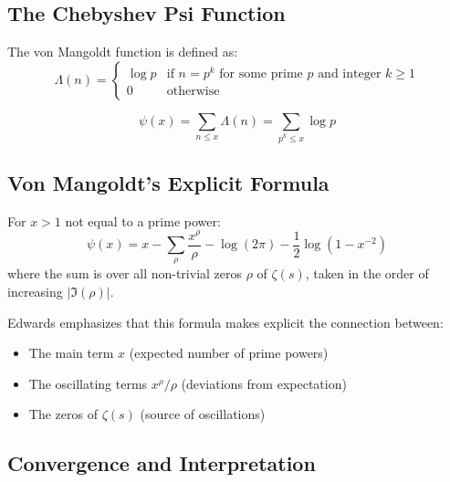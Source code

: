 \subsection{The Chebyshev Psi Function}

\begin{definition}
The von Mangoldt function is defined as:
\begin{equation}
\Lambda(n) = \begin{cases}
\log p & \text{if } n = p^k \text{ for some prime } p \text{ and integer } k \geq 1\\
0 & \text{otherwise}
\end{cases}
\end{equation}
\end{definition}

\begin{definition}
\begin{equation}
\psi(x) = \sum_{n \leq x} \Lambda(n) = \sum_{p^k \leq x} \log p
\end{equation}
\end{definition}

\subsection{Von Mangoldt's Explicit Formula}

\begin{theorem}
For $x > 1$ not equal to a prime power:
\begin{equation}
\psi(x) = x - \sum_{\rho} \frac{x^{\rho}}{\rho} - \log(2\pi) - \frac{1}{2}\log\left(1 - x^{-2}\right)
\end{equation}
where the sum is over all non-trivial zeros $\rho$ of $\zeta(s)$, taken in the order of increasing $|\Im(\rho)|$.
\end{theorem}

Edwards emphasizes that this formula makes explicit the connection between:
\begin{itemize}
\item The main term $x$ (expected number of prime powers)
\item The oscillating terms $x^{\rho}/\rho$ (deviations from expectation)
\item The zeros of $\zeta(s)$ (source of oscillations)
\end{itemize}

\subsection{Convergence and Interpretation}

